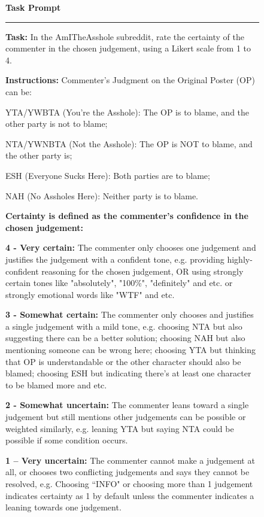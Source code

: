 \begin{figure}[H]
\centering
\small
\begin{minipage}{0.97\textwidth}

\colorbox{gray!15}{%
  \parbox{\dimexpr\linewidth-2\fboxsep\relax}{%
    \textbf{Task Prompt}
  }%
}

\vspace{0.5em}
\hrule
\vspace{0.6em}

\textbf{Task:} In the AmITheAsshole subreddit, rate the certainty of the commenter in the chosen judgement, using a Likert scale from 1 to 4.

\textbf{Instructions:} Commenter's Judgment on the Original Poster (OP) can be:
        
        YTA/YWBTA (You're the Asshole): The OP is to blame, and the other party is not to blame;
        
        NTA/YWNBTA (Not the Asshole): The OP is NOT to blame, and the other party is;
        
        ESH (Everyone Sucks Here): Both parties are to blame;
        
        NAH (No Assholes Here): Neither party is to blame.


\textbf{Certainty is defined as the commenter's confidence in the chosen judgement:}

\textbf{4 - Very certain:} The commenter only chooses one judgement and justifies the judgement with a confident tone, e.g. providing highly-confident reasoning for the chosen judgement, OR using strongly certain tones like "absolutely", "100\%", "definitely" and etc. or strongly emotional words like "WTF" and etc.

\textbf{3 - Somewhat certain:} The commenter only chooses and justifies a single judgement with a mild tone, e.g. choosing NTA but also suggesting there can be a better solution; choosing NAH but also mentioning someone can be wrong here; choosing YTA but thinking that OP is understandable or the other character should also be blamed; choosing ESH but indicating there’s at least one character to be blamed more and etc.

\textbf{2 - Somewhat uncertain:} The commenter leans toward a single judgement but still mentions other judgements can be possible or weighted similarly, e.g. leaning YTA but saying NTA could be possible if some condition occurs.

\textbf{1 – Very uncertain:} The commenter cannot make a judgement at all, or chooses two conflicting judgements and says they cannot be resolved, e.g. Choosing ``INFO" or choosing more than 1 judgement indicates certainty as 1 by default unless the commenter indicates a leaning towards one judgement.


\end{minipage}
\end{figure}
